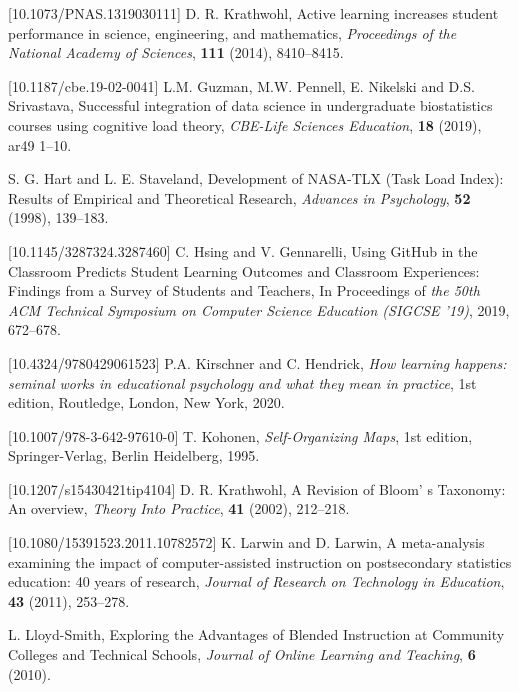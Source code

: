 \documentclass{aims}
\theoremstyle{definition}
\begin{document}
\begin{thebibliography}{99}
 [10.1073/PNAS.1319030111]
     \newblock  D. R. Krathwohl,
     \newblock Active learning increases student performance in science, engineering, and mathematics,
     \newblock \emph{Proceedings of the National Academy of Sciences}, \textbf{111} (2014), 8410--8415.

 [10.1187/cbe.19-02-0041]
     \newblock L.M. Guzman, M.W. Pennell, E. Nikelski and D.S. Srivastava,
     \newblock Successful integration of data science in undergraduate biostatistics courses using cognitive load theory,
     \newblock \emph{CBE-Life Sciences Education}, \textbf{18} (2019), ar49 1--10.

     \newblock S. G. Hart and L. E. Staveland,
     \newblock Development of NASA-TLX (Task Load Index): Results of Empirical and Theoretical Research,
     \newblock \emph{Advances in Psychology}, \textbf{52} (1998), 139--183.

 [10.1145/3287324.3287460]
     \newblock C. Hsing and V. Gennarelli,
     \newblock Using GitHub in the Classroom Predicts Student Learning Outcomes and Classroom Experiences: Findings from a Survey of Students and Teachers,
     \newblock In Proceedings of \emph{the 50th ACM Technical Symposium on Computer Science Education (SIGCSE '19)}, 2019, 672–678.

 [10.4324/9780429061523]
     \newblock P.A. Kirschner and C. Hendrick,
     \newblock \emph{How learning happens: seminal works in educational psychology and what they mean in practice},
     \newblock 1st edition, Routledge, London, New York, 2020.

 [10.1007/978-3-642-97610-0]
     \newblock T.  Kohonen,
     \newblock \emph{Self-Organizing Maps},
     \newblock 1st edition, Springer-Verlag, Berlin Heidelberg, 1995.

 [10.1207/s15430421tip4104]
     \newblock  D. R. Krathwohl,
     \newblock A Revision of Bloom' s Taxonomy: An overview,
     \newblock \emph{Theory Into Practice}, \textbf{41} (2002), 212--218.

 [10.1080/15391523.2011.10782572]
     \newblock  K. Larwin and D. Larwin,
     \newblock A meta-analysis examining the impact of computer-assisted instruction on postsecondary statistics education: 40 years of research,
     \newblock \emph{Journal of Research on Technology in Education}, \textbf{43} (2011), 253--278.

     \newblock  L. Lloyd-Smith,
     \newblock Exploring the Advantages of Blended Instruction at Community Colleges and Technical Schools,
     \newblock \emph{Journal of Online Learning and Teaching}, \textbf{6} (2010).


\end{thebibliography}
\end{document}
